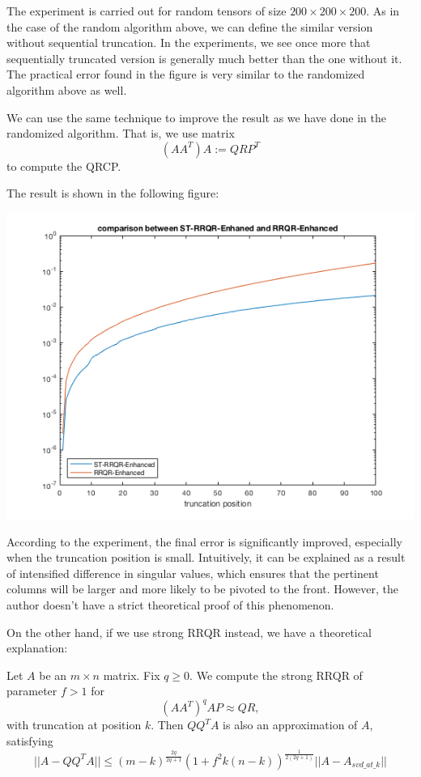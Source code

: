 \documentclass[12pt]{article}
\begin{document}
The experiment is carried out for random tensors of size $200 \times 200 \times 200$. As in the case of the random algorithm above, we can define the similar version without sequential truncation. In the experiments, we see once more that sequentially truncated version is generally much better than the one without it. The practical error found in the figure is very similar to the randomized algorithm above as well.

We can use the same technique to improve the result as we have done in the randomized algorithm. That is, we use matrix
$$ (AA^T)A := QRP^T$$
to compute the QRCP.

The result is shown in the following figure:


\centerline{\includegraphics[scale=0.7]{tensorRRQREnh}}

According to the experiment, the final error is significantly improved, especially when the truncation position is small. Intuitively, it can be explained as a result of intensified difference in singular values, which ensures that the pertinent columns will be larger and more likely to be pivoted to the front. However, the author doesn't have a strict theoretical proof of this phenomenon.

On the other hand, if we use strong RRQR instead, we have a theoretical explanation: 

\begin{mythm}
\label{rrqrenh}
Let $A$ be an $m \times n$ matrix. Fix $q \geq 0$. We compute the strong RRQR of parameter $f > 1$ for 
$$ (AA^T) ^q  AP \approx QR, $$
with truncation at position $k$. Then $QQ^TA$ is also an approximation of $A$, satisfying
$$ || A - QQ^TA || \leq  (m-k)^\frac{2q}{2q+1} (1 + f^2k(n-k))^\frac{1}{2(2q+1)} || A - A_{svd\_at\_k} ||  $$
\end{mythm}
\end{document}
